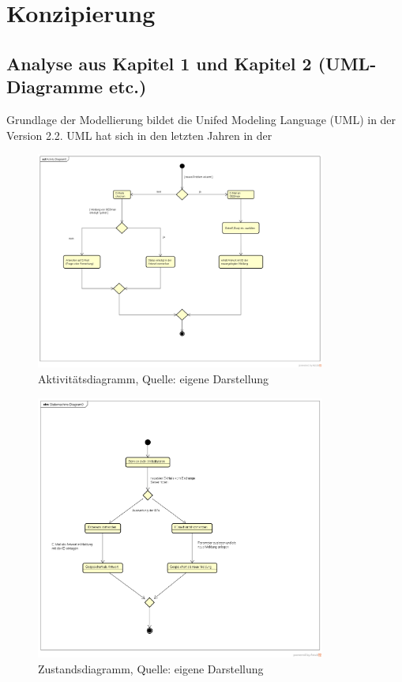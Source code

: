 \section{Konzipierung}
\subsection{Analyse aus Kapitel 1 und Kapitel 2 (UML-Diagramme etc.)}

\noindent
Grundlage der Modellierung bildet die Unifed Modeling Language (UML) in der Version 2.2. UML hat sich in den letzten Jahren in der  


\begin{figure}[h!]
\centering
\includegraphics[width=0.85\textwidth]{Abbildungen/Aktivitaetsdiagramm.png}
	\caption[Aktivit{\"a}tsdiagramm]{Aktivit{\"a}tsdiagramm, Quelle: eigene Darstellung}
	\label{fig:Aktivitaetsdiagramm}
\end{figure}


\begin{figure}[h!]
\centering
\includegraphics[width=0.85\textwidth]{Abbildungen/Zustandsdiagramm.png}
	\caption[Zustandsdiagramm]{Zustandsdiagramm, Quelle: eigene Darstellung}
	\label{fig:Zustandsdiagramm}
\end{figure}



